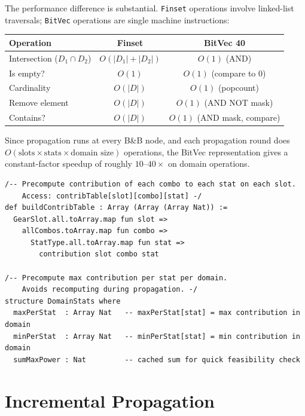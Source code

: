 \documentclass[11pt, a4paper, oneside]{book}
\begin{document}
The performance difference is substantial.  \texttt{Finset} operations
involve linked-list traversals; \texttt{BitVec} operations are single
machine instructions:

\begin{center}
\small
\begin{tabular}{lcc}
\toprule
\textbf{Operation} & \textbf{Finset} & \textbf{BitVec 40} \\
\midrule
Intersection ($D_1 \cap D_2$) & $O(|D_1| + |D_2|)$ & $O(1)$ (AND) \\
Is empty? & $O(1)$ & $O(1)$ (compare to 0) \\
Cardinality & $O(|D|)$ & $O(1)$ (popcount) \\
Remove element & $O(|D|)$ & $O(1)$ (AND NOT mask) \\
Contains? & $O(|D|)$ & $O(1)$ (AND mask, compare) \\
\bottomrule
\end{tabular}
\end{center}

Since propagation runs at every B\&B node, and each propagation round does
$O(\text{slots} \times \text{stats} \times \text{domain size})$ operations,
the BitVec representation gives a constant-factor speedup of roughly $10$--$40\times$
on domain operations.

\begin{leanbox}[title={Lean 4 --- Precomputed Contribution Tables}]
\begin{verbatim}
/-- Precompute contribution of each combo to each stat on each slot.
    Access: contribTable[slot][combo][stat] -/
def buildContribTable : Array (Array (Array Nat)) :=
  GearSlot.all.toArray.map fun slot =>
    allCombos.toArray.map fun combo =>
      StatType.all.toArray.map fun stat =>
        contribution slot combo stat

/-- Precompute max contribution per stat per domain.
    Avoids recomputing during propagation. -/
structure DomainStats where
  maxPerStat  : Array Nat   -- maxPerStat[stat] = max contribution in domain
  minPerStat  : Array Nat   -- minPerStat[stat] = min contribution in domain
  sumMaxPower : Nat         -- cached sum for quick feasibility check
\end{verbatim}
\end{leanbox}

\section{Incremental Propagation}
\end{document}
